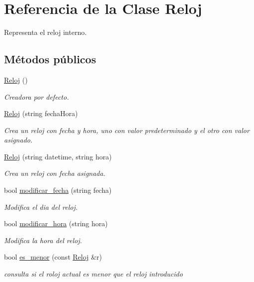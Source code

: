 \hypertarget{class_reloj}{\section{Referencia de la Clase Reloj}
\label{class_reloj}
}


Representa el reloj interno.  


\subsection*{Métodos públicos}
\begin{DoxyCompactItemize}
\item 
\hyperlink{class_reloj_a0966eaa7e7079419049e683bafa7dbc0}{Reloj} ()
\begin{DoxyCompactList}\small\item\em Creadora por defecto. \end{DoxyCompactList}\item 
\hyperlink{class_reloj_a86f51a4c60125a60897c180303b4f7cc}{Reloj} (string fecha\-Hora)
\begin{DoxyCompactList}\small\item\em Crea un reloj con fecha y hora, uno con valor predeterminado y el otro con valor asignado. \end{DoxyCompactList}\item 
\hyperlink{class_reloj_ad74790adea13c7fec942f4733e7a64ba}{Reloj} (string datetime, string hora)
\begin{DoxyCompactList}\small\item\em Crea un reloj con fecha asignada. \end{DoxyCompactList}\item 
bool \hyperlink{class_reloj_af996940ee33d23f3d592b96338210f3b}{modificar\-\_\-fecha} (string fecha)
\begin{DoxyCompactList}\small\item\em Modifica el dia del reloj. \end{DoxyCompactList}\item 
bool \hyperlink{class_reloj_ac19961f7455f4e255fe4ef7fa809ceb1}{modificar\-\_\-hora} (string hora)
\begin{DoxyCompactList}\small\item\em Modifica la hora del reloj. \end{DoxyCompactList}\item 
bool \hyperlink{class_reloj_a8aa72ede1abf643eeb3e9afafe37c273}{es\-\_\-menor} (const \hyperlink{class_reloj}{Reloj} \&r)
\begin{DoxyCompactList}\small\item\em consulta si el roloj actual es menor que el reloj introducido \end{DoxyCompactList}\item 

\end{DoxyCompactItemize}
